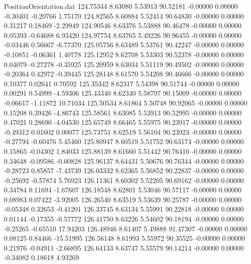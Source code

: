 \begin{filecontents}{PositionOrientation.dat}
 124.75344    8.63080    5.53913    90.52181   -0.00000    0.00000   -0.30401   -0.20766    1.75170
 124.82565    8.60884    5.52414    90.64830   -0.00000    0.00000    0.31217    0.18469   -2.29949
 124.90546    8.63376    5.53888    90.46478   -0.00000    0.00000    0.05393   -0.64688    6.93420
 124.97754    8.63765    5.49226    90.96455   -0.00000    0.00000   -0.03446    0.56667   -6.77370
 125.05756    8.63489    5.53761    90.42247   -0.00000    0.00000   -0.10851   -0.06361    1.40778
 125.12952    8.62708    5.53303    90.52378   -0.00000    0.00000    0.04079   -0.27278   -0.35925
 125.20959    8.63034    5.51119    90.49502   -0.00000    0.00000   -0.20364    0.42972   -0.39445
 125.28148    8.61570    5.54208    90.46666   -0.00000    0.00000    0.10377    0.02641    0.70592
 125.35342    8.62317    5.54398    90.51744   -0.00000    0.00000    0.00291    0.54999   -4.59306
 125.43340    8.62340    5.58797    90.15009   -0.00000    0.00000   -0.06617   -1.11872   10.71034
 125.50534    8.61864    5.50748    90.92065   -0.00000    0.00000    0.15208    0.39426   -4.86743
 125.58561    8.63085    5.53913    90.52995   -0.00000    0.00000    0.47021    0.28690   -4.04530
 125.65749    8.66465    5.55975    90.23917   -0.00000    0.00000   -0.49312    0.01602    0.00077
 125.73751    8.62519    5.56104    90.23923   -0.00000    0.00000   -0.27794   -0.60476    5.45460
 125.80947    8.60519    5.51752    90.63174   -0.00000    0.00000    0.15865   -0.04302    1.84033
 125.88139    8.61660    5.51442    90.76410   -0.00000    0.00000    0.34648   -0.09586   -0.00828
 125.96137    8.64431    5.50676    90.76344   -0.00000    0.00000   -0.28723    0.85857   -7.43739
 126.03332    8.62365    5.56852    90.22837   -0.00000    0.00000   -0.25692   -0.57874    5.76923
 126.11361    8.60302    5.52205    90.69162   -0.00000    0.00000    0.34784    0.11694   -1.67607
 126.18548    8.62801    5.53046    90.57117   -0.00000    0.00000    0.08983    0.07422   -3.92005
 126.26540    8.63519    5.53639    90.25787   -0.00000    0.00000   -0.05348    0.32653   -0.41201
 126.33745    8.63134    5.55991    90.22818   -0.00000    0.00000    0.01144   -0.17355   -0.57772
 126.41750    8.63226    5.54602    90.18194   -0.00000    0.00000   -0.25265   -0.65510   17.94203
 126.48946    8.61407    5.49888    91.47307   -0.00000    0.00000    0.08125    0.84466  -15.51995
 126.56148    8.61993    5.55972    90.35525   -0.00000    0.00000    0.21976   -0.04911   -2.66895
 126.64133    8.63747    5.55579    90.14214   -0.00000    0.00000   -0.34082    0.18618    4.93269

\end{filecontents}
